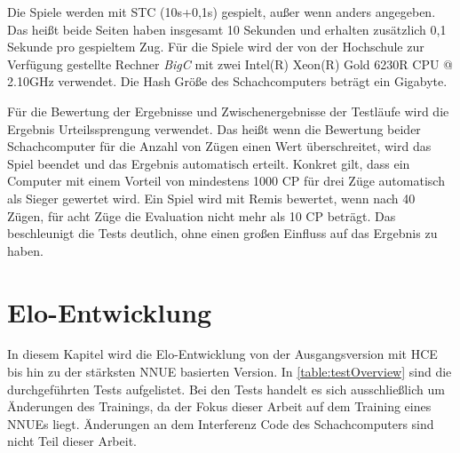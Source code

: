 Die Spiele werden mit \ac{STC} (10s+0,1s) gespielt, außer wenn anders angegeben. Das heißt beide Seiten haben insgesamt 10 Sekunden und erhalten zusätzlich 0,1 Sekunde pro gespieltem Zug. Für die Spiele wird der von der Hochschule zur Verfügung gestellte Rechner \emph{BigC} mit zwei Intel(R) Xeon(R) Gold 6230R CPU @ 2.10GHz verwendet. Die Hash Größe des Schachcomputers beträgt ein Gigabyte.

Für die Bewertung der Ergebnisse und Zwischenergebnisse der Testläufe wird die Ergebnis Urteilssprengung verwendet. Das heißt wenn die Bewertung beider Schachcomputer für die Anzahl von Zügen einen Wert überschreitet, wird das Spiel beendet und das Ergebnis automatisch erteilt. Konkret gilt, dass ein Computer mit einem Vorteil von mindestens 1000 \ac{CP} für drei Züge automatisch als Sieger gewertet wird. Ein Spiel wird mit Remis bewertet, wenn nach 40 Zügen, für acht Züge die Evaluation nicht mehr als 10 \ac{CP} beträgt. Das beschleunigt die Tests deutlich, ohne einen großen Einfluss auf das Ergebnis zu haben.

\section{Elo-Entwicklung}

In diesem Kapitel wird die Elo-Entwicklung von der Ausgangsversion mit \ac{HCE} bis hin zu der stärksten \ac{NNUE} basierten Version. In \autoref{table:testOverview} sind die durchgeführten Tests aufgelistet. Bei den Tests handelt es sich ausschließlich um Änderungen des Trainings, da der Fokus dieser Arbeit auf dem Training eines \acp{NNUE} liegt. Änderungen an dem Interferenz Code des Schachcomputers sind nicht Teil dieser Arbeit.

